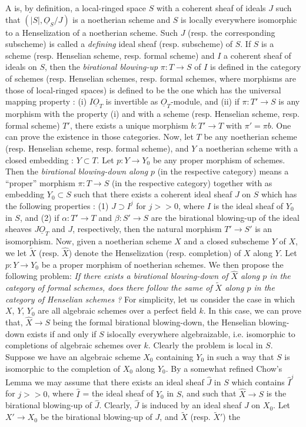A is, by definition, a local-ringed space $S$ with a coherent sheaf of ideals $J$ such that $(|S|,\underline{O}_{S}/J)$ is a noetherian scheme and $S$ is locally everywhere isomorphic to a Henselization of a noetherian scheme. Such $J$ (resp. the corresponding subscheme) is called a {\em defining} ideal sheaf (resp. subscheme) of $S$. If $S$ is a scheme (resp. Henselian scheme, resp. formal scheme) and $I$ a coherent sheaf of ideals on $S$, then the {\em birational blowing-up} $\pi:T\to S$ of $I$ is defined in the category of schemes (resp. Henselian schemes, resp. formal schemes, where morphisms are those of local-ringed spaces) is defined to be the one which has the universal mapping property : (i) $I\underline{O}_{T}$ is invertible as $\underline{O}_{T}$-module, and (ii) if $\pi:T'\to S$ is any morphism with the property (i) and with a scheme (resp. Henselian scheme, resp. formal scheme) $T'$, there exists a unique morphism $b:T'\to T$ with $\pi'=\pi b$. One can prove the existence in those categories. Now, let $T$ be any noetherian scheme (resp. Henselian scheme, resp. formal scheme), and $Y$ a noetherian scheme with a closed embedding : $Y\subset T$. Let $p:Y\to Y_{0}$ be any proper morphism of schemes. Then the {\em birational blowing-down along} $p$ (in the respective category) means a ``proper'' morphism $\pi:T\to S$ (in the respective category) together with as embedding $Y_{0}\subset S$ such that there exists a coherent ideal sheaf $J$ on $S$ which has the following properties : (1) $J\supset I^{j}$ for $j>>0$, where $I$ is the ideal sheaf of $Y_{0}$ in $S$, and (2) if $\alpha:T'\to T$ and $\beta:S'\to S$ are the birational blowing-up of the ideal sheaves $J\underline{O}_{T}$ and $J$, respectively, then the natural morphism $T'\to S'$ is an isomorphism. Now, given a noetherian scheme $X$ and a closed subscheme $Y$ of $X$, we let $\widetilde{X}$ (resp. $\widehat{X}$) denote the Henselization (resp. completion) of $X$ along $Y$. Let $p:Y\to Y_{0}$ be a proper morphism of noetherian schemes. We then propose the following problem: {\em If there exists a birational blowing-down of $\widehat{X}$ along $p$ in the category of formal schemes, does there follow the same of $\widetilde{X}$ along $p$ in the category of Henselian schemes ?} For simplicity, let us consider the case in which $X$, $Y$, $Y_{0}$ are all algebraic schemes over a perfect field $k$. In this case, we can prove that, $\widehat{X}\to S$ being the formal birational blowing-down, the Henselian blowing-down exists if and only if $S$ is\pageoriginale locally everywhere algebraizable, i.e. isomorphic to completions of algebraic schemes over $k$. Clearly the problem is local in $S$. Suppose we have an algebraic scheme $X_{0}$ containing $Y_{0}$ in such a way that $S$ is isomorphic to the completion of $X_{0}$ along $Y_{0}$. By a somewhat refined Chow's Lemma we may assume that there exists an ideal sheaf $\widehat{J}$ in $S$ which contains $\widehat{I}^{j}$ for $j>>0$, where $\widehat{I}$ = the ideal sheaf of $Y_{0}$ in $S$, and such that $\widehat{X}\to S$ is the birational blowing-up of $\widehat{J}$. Clearly, $\widehat{J}$ is induced by an ideal sheaf $J$ on $X_{0}$. Let $X'\to X_{0}$ be the birational blowing-up of $J$, and $\widetilde{X}$ (resp. $\widetilde{X}'$) the 